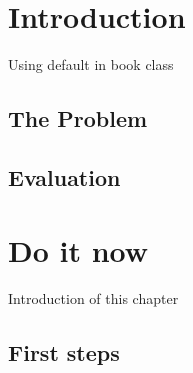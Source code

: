 \documentclass{book}
\begin{document}
\chapter{Introduction}

Using default in book class

\section{The Problem}
\label{sec:problem}

\lipsum[1]

\section{Evaluation}

\lipsum[2]

\chapter{Do it now}

Introduction of this chapter

\lipsum[3]

\section{First steps}
\label{sec:first-steps}

\lipsum
\end{document}
